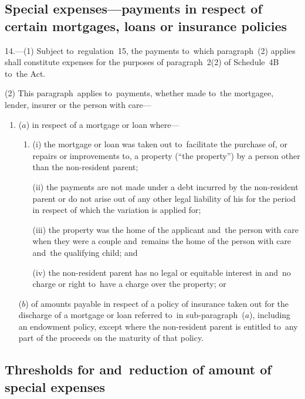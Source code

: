 \documentclass[12pt,a4paper]{article}
\begin{document}
\subsection[14. Special expenses—payments in respect of certain mortgages, loans or insurance policies]{\sloppy Special expenses—payments in respect of certain mortgages, loans or insurance policies}

14.---(1)  Subject to~regulation~15, the payments to~which paragraph~(2) applies shall constitute expenses for the purposes of paragraph~2(2) of Schedule~4B to~the Act.

(2) This paragraph~applies to~payments, whether made to~the mortgagee, lender, insurer or the person with care—
\begin{enumerate}\item[]
($a$) in respect of a mortgage or loan where—
\begin{enumerate}\item[]
(i) the mortgage or loan was taken out to~facilitate the purchase of, or repairs or improvements to, a property (“the property”) by a person other than the non-resident parent;

(ii) the payments are not made under a debt incurred by the non-resident parent or do not arise out of any other legal liability of his for the period in respect of which the variation is applied for;

(iii) the property was the home of the applicant and~the person with care when they were a couple and~remains the home of the person with care and~the qualifying child; and

(iv) the non-resident parent has no legal or equitable interest in and~no charge or right to~have a charge over the property; or
\end{enumerate}

($b$) of amounts payable in respect of a policy of insurance taken out for the discharge of a mortgage or loan referred to~in sub-paragraph~($a$), including an endowment policy, except where the non-resident parent is entitled to~any part of the proceeds on the maturity of that policy.
\end{enumerate}

\subsection[15. Thresholds for and~reduction of amount of special expenses]{Thresholds for and~reduction of amount of special expenses}
\end{document}
